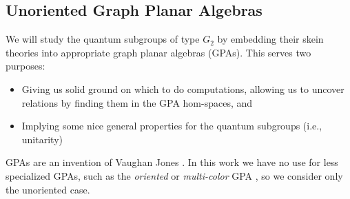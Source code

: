 \begin{comment}
\begin{proof}
    Compute directly:
    \begin{align*}
        \ldag F(f),F(f)\rdag & = \tr(F(f)^\dagger\circ F(f)) \\
        & = \tr(F(f^\dagger)\circ F(f)) \\
        & = F( \tr(f^\dagger \circ f)) \\
        & = F(0)=0
    \end{align*}
    since we assumed $f$ was negligible.
\end{proof}

As one might expect, and as was alluded to above, unitarity interacts nicely with the negligible ideal.

\begin{proposition}
    Let $\CC$ and $\DD$ be unitary, and suppose $F:\CC\to\DD$ is a pivotal dagger functor. 
    Then there is a faithful 
    $\tilde{F}:\ol{\CC} \to \ol{\DD}$
    such that
    \[
        \xymatrix@C=40pt{
        \CC \ar[r]^-{F} \ar[d] & \DD \ar[d] \\
        \ol{\CC}\ar[r]^-{\tilde{F}} & \ol{\DD}  \\
        }
    \]
    If $F$ is faithful, so is $\tilde{F}$.
\end{proposition}

\begin{proof}
    \red{ Compose $\ol{F}$ of Proposition~\ref{prop:negligible-induced-functor} with the functor $\DD \onto \ol{\DD}$. ??}
\end{proof}
\end{comment}







\subsection{Unoriented Graph Planar Algebras}
We will study the quantum subgroups of type $G_2$ by embedding their skein theories into appropriate graph planar algebras (GPAs). 
This serves two purposes:
\begin{itemize}
    \item Giving us solid ground on which to do computations, allowing us to uncover relations by finding them in the GPA hom-spaces, and
    \item Implying some nice general properties for the quantum subgroups (i.e., unitarity)
\end{itemize}
GPAs are an invention of Vaughan Jones \cite{jones_GPA}.
In this work we have no use for less specialized GPAs, such as the {\it oriented} \cite{Cain_Dan} 
or {\it multi-color} GPA \cite{emily}, so we consider only the unoriented case. 

